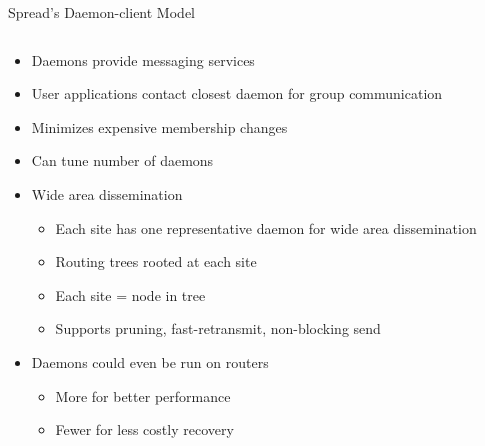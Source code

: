 \documentclass[pdftex]{beamer}
\begin{document}

\begin{frame}{Spread's Daemon-client Model}
\begin{columns}
\begin{column}{\textwidth}

\begin{itemize}
\item Daemons provide messaging services
\item User applications contact closest daemon for group communication
\item Minimizes expensive membership changes
\item Can tune number of daemons
\item Wide area dissemination
	\begin{itemize}
\item Each site has one representative daemon for wide area dissemination
\item Routing trees rooted at each site
\item Each site = node in tree
\item Supports pruning, fast-retransmit, non-blocking send
	\end{itemize}
\item Daemons could even be run on routers
	\begin{itemize}
		\item More for better performance
		\item Fewer for less costly recovery
	\end{itemize}
	
\end{itemize}
\end{column}

\end{columns}
\end{frame}

\end{document}
